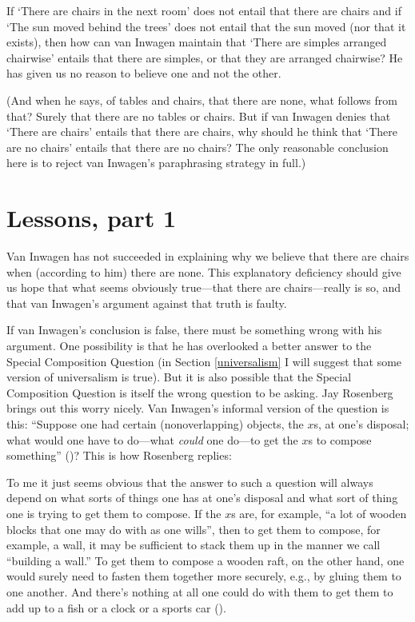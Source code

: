 \documentclass[12pt,twoside]{reedfancy}
\newenvironment{squote}{%
	\begin{spacing}{1}
	\begin{list}{}{%
	\setlength{\labelwidth}{0pt}%
	\rightmargin\leftmargin%
	}
	\item\relax
	}{%
	\end{list}%
	\end{spacing}
	}
\begin{document}
\begin{spacing}{1.25}
If `There are chairs in the next room' does not entail that there are
chairs and if `The sun moved behind the trees' does not entail that
the sun moved (nor that it exists), then how can van Inwagen maintain
that `There are simples arranged chairwise' entails that there are
simples, or that they are arranged chairwise?  He has given us no
reason to believe one and not the other.

(And when he says, of tables and chairs, that there are none, what
follows from that?  Surely that there are no tables or chairs.  But if
van Inwagen denies that `There are chairs' entails that there are
chairs, why should he think that `There are no chairs' entails that
there are no chairs?  The only reasonable conclusion here is to reject
van Inwagen's paraphrasing strategy in full.)

\section{Lessons, part 1}
\label{lessons-v}
Van Inwagen has not succeeded in explaining why we believe that there
are chairs when (according to him) there are none.  This explanatory
deficiency should give us hope that what seems obviously true---that
there are chairs---really is so, and that van Inwagen's argument
against that truth is faulty.

If van Inwagen's conclusion is false, there must be something wrong
with his argument.  One possibility is that he has overlooked a better
answer to the Special Composition Question (in Section
\ref{universalism} I will suggest that some version of universalism is
true).  But it is also possible that the Special Composition Question
is itself the wrong question to be asking.  Jay Rosenberg brings out
this worry nicely.  Van Inwagen's informal version of the question is
this: ``Suppose one had certain (nonoverlapping) objects, the $x$s, at
one's disposal; what would one have to do---what {\em could} one
do---to get the $x$s to compose something''
(\citeyear[31]{inwagen1995})?  This is how Rosenberg replies:

\begin{squote}
To me it just seems obvious that the answer to such a question will
always depend on what sorts of things one has at one's disposal and
what sort of thing one is trying to get them to compose.  If the $x$s
are, for example, ``a lot of wooden blocks that one may do with as one
wills'', then to get them to compose, for example, a wall, it may be
sufficient to stack them up in the manner we call ``building a wall.''
To get them to compose a wooden raft, on the other hand, one would
surely need to fasten them together more securely, e.g., by gluing
them to one another.  And there's nothing at all one could do with
them to get them to add up to a fish or a clock or a sports car
(\citeyear[705]{rosenberg1993}).
\end{squote}


\end{spacing}
\end{document}
